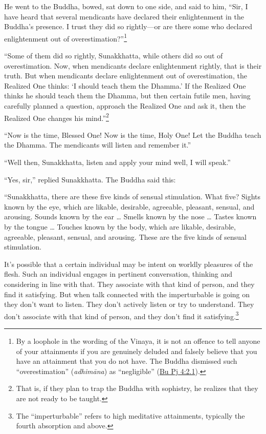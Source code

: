 \documentclass[12pt,openany]{book}%
\begin{document}
He went to the Buddha, bowed, sat down to one side, and said to him, “Sir, I have heard that several mendicants have declared their enlightenment in the Buddha’s presence. I trust they did so rightly—or are there some who declared enlightenment out of overestimation?”\footnote{By a loophole in the wording of the Vinaya, it is not an offence to tell anyone of your attainments if you are genuinely deluded and falsely believe that you have an attainment that you do not have. The Buddha dismissed such “overestimation” (\textit{\textsanskrit{adhimāna}}) as “negligible” (\href{https://suttacentral.net/pli-tv-bu-vb-pj4/en/sujato\#2.1}{Bu Pj 4:2.1}). } 

“Some of them did so rightly, Sunakkhatta, while others did so out of overestimation. Now, when mendicants declare enlightenment rightly, that is their truth. But when mendicants declare enlightenment out of overestimation, the Realized One thinks: ‘I should teach them the Dhamma.’ If the Realized One thinks he should teach them the Dhamma, but then certain futile men, having carefully planned a question, approach the Realized One and ask it, then the Realized One changes his mind.”\footnote{That is, if they plan to trap the Buddha with sophistry, he realizes that they are not ready to be taught. } 

“Now is the time, Blessed One! Now is the time, Holy One! Let the Buddha teach the Dhamma. The mendicants will listen and remember it.” 

“Well then, Sunakkhatta, listen and apply your mind well, I will speak.” 

“Yes, sir,” replied Sunakkhatta. The Buddha said this: 

“Sunakkhatta, there are these five kinds of sensual stimulation. What five? Sights known by the eye, which are likable, desirable, agreeable, pleasant, sensual, and arousing. Sounds known by the ear … Smells known by the nose … Tastes known by the tongue … Touches known by the body, which are likable, desirable, agreeable, pleasant, sensual, and arousing. These are the five kinds of sensual stimulation. 

It’s possible that a certain individual may be intent on worldly pleasures of the flesh. Such an individual engages in pertinent conversation, thinking and considering in line with that. They associate with that kind of person, and they find it satisfying. But when talk connected with the imperturbable is going on they don’t want to listen. They don’t actively listen or try to understand. They don’t associate with that kind of person, and they don’t find it satisfying.\footnote{The “imperturbable” refers to high meditative attainments, typically the fourth absorption and above. } 
\end{document}
